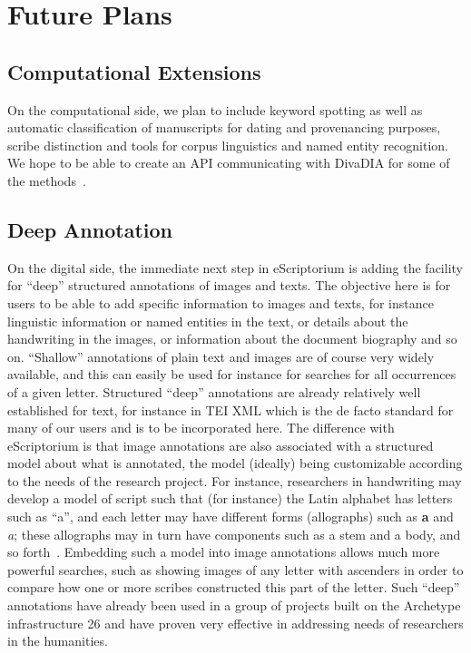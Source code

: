 \section{Future Plans}

\subsection{Computational Extensions}

On the computational side, we plan to include keyword spotting as well as
automatic classification of manuscripts for dating and provenancing purposes,
scribe distinction and tools for corpus linguistics and named entity
recognition. We hope to be able to create an API communicating with DivaDIA for
some of the methods~\cite{wursch2017divaservices}.

\subsection{Deep Annotation}

On the digital side, the immediate next step in eScriptorium is adding the
facility for “deep” structured annotations of images and texts. The objective
here is for users to be able to add specific information to images and texts,
for instance linguistic information or named entities in the text, or details
about the handwriting in the images, or information about the document
biography and so on. “Shallow” annotations of plain text and images are of
course very widely available, and this can easily be used for instance for
searches for all occurrences of a given letter. Structured “deep” annotations
are already relatively well established for text, for instance in TEI XML which
is the de facto standard for many of our users and is to be incorporated here.
The difference with eScriptorium is that image annotations are also associated
with a structured model about what is annotated, the model (ideally) being
customizable according to the needs of the research project. For instance,
researchers in handwriting may develop a model of script such that (for
instance) the Latin alphabet has letters such as “a”, and each letter may have
different forms (allographs) such as \textbf{a} and \textit{a}; these
allographs may in turn have components such as a stem and a body, and so
forth~\cite{stokes2018modelling}.  Embedding such a model into image annotations
allows much more powerful searches, such as showing images of any letter with
ascenders in order to compare how one or more scribes constructed this part of
the letter. Such “deep” annotations have already been used in a group of
projects built on the Archetype infrastructure 26 and have proven very
effective in addressing needs of researchers in the humanities.

